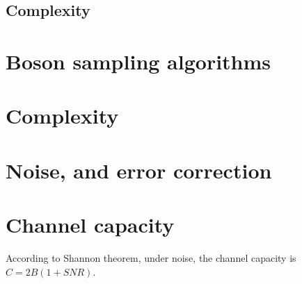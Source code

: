 \subsection{Complexity}

\section{Boson sampling algorithms}

\section{Complexity}

\section{Noise, and error correction}
\section{Channel capacity}
According to Shannon theorem, under noise, the channel capacity is $C = 2B (1+SNR)$.
